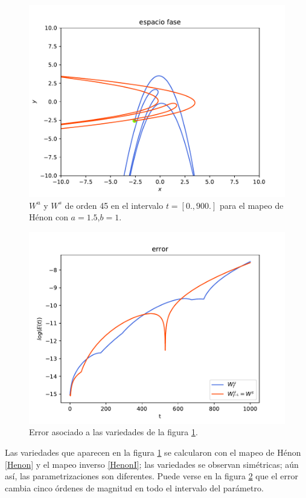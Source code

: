 \begin{figure}[H]
\centering
\includegraphics[scale=0.7]{h15}
\caption{$W^{u}$ y $W^{s}$ de orden 45 en el intervalo $t=[0.,900.]$ para el mapeo de Hénon con $a=1.5$,$b=1$.}
\label{Henon1}
\end{figure}

\begin{figure}[H]
\centering
\includegraphics[scale=0.7]{errorH15}
\caption{Error asociado a las variedades de la figura \ref{Henon1}.}
\label{ErrorHenon1}
\end{figure}
Las variedades que aparecen en la figura \ref{Henon1} se calcularon con el mapeo de Hénon \eqref{Henon} y el mapeo inverso \eqref{HenonI}; las variedades se observan simétricas; aún así, las parametrizaciones son diferentes. Puede verse en la figura \ref{ErrorHenon1} que el error cambia cinco órdenes de magnitud en todo el intervalo del parámetro.\\

